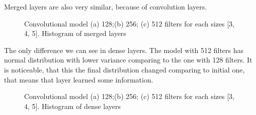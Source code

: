 \noindent
\\
\\
\\
\\
\\
Merged layers are also very similar, because of convolution layers.

\begin{figure}[ht]
	\begin{minipage}[ht]{1\linewidth}
	\end{minipage}
	\hfill
	\begin{minipage}[ht]{1\linewidth}
	\end{minipage}
	\begin{minipage}[ht]{1\linewidth}
	\end{minipage}
	\caption{Convolutional model (a) 128;(b) 256; (c) 512 filters for each sizes [3, 4, 5]. Histogram of merged layers}
	\label{img:3CNN_merged_layers}  
\end{figure}

\clearpage
The only difference we can see in dense layers. The model with 512 filters has normal distribution with lower variance comparing to the one with 128 filters. It is noticeable, that this the final distribution changed comparing to initial one, that means that layer learned some information. 

\begin{figure}[ht]
	\begin{minipage}[ht]{1\linewidth}
	\end{minipage}
	\hfill
	\begin{minipage}[ht]{1\linewidth}
	\end{minipage}
	\begin{minipage}[ht]{1\linewidth}
	\end{minipage}
	\caption{Convolutional model (a) 128;(b) 256; (c) 512 filters for each sizes [3, 4, 5]. Histogram of dense layers}
	\label{img:3CNN_dense_layers}  
\end{figure}

